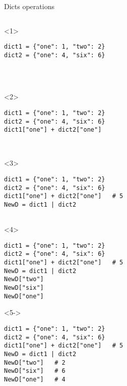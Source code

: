 \begin{frame}[fragile]{Dicts operations}

  \begin{columns}[onlytextwidth]
    \begin{column}{\textwidth}

      \begin{onlyenv}<1>
        \begin{lstlisting}[style=python,morekeywords={for, in, range, list}]
dict1 = {"one": 1, "two": 2}
dict2 = {"one": 4, "six": 6}




 \end{lstlisting}
      \end{onlyenv}

      \begin{onlyenv}<2>
        \begin{lstlisting}[style=python,morekeywords={for, in, range, list}]
dict1 = {"one": 1, "two": 2}
dict2 = {"one": 4, "six": 6}
dict1["one"] + dict2["one"]



 \end{lstlisting}
      \end{onlyenv}

      \begin{onlyenv}<3>
        \begin{lstlisting}[style=python,morekeywords={for, in, range, list}]
dict1 = {"one": 1, "two": 2}
dict2 = {"one": 4, "six": 6}
dict1["one"] + dict2["one"]   # 5
NewD = dict1 | dict2


 \end{lstlisting}
      \end{onlyenv}

      \begin{onlyenv}<4>
        \begin{lstlisting}[style=python,morekeywords={for, in, range, list}]
dict1 = {"one": 1, "two": 2}
dict2 = {"one": 4, "six": 6}
dict1["one"] + dict2["one"]   # 5
NewD = dict1 | dict2
NewD["two"]
NewD["six"]
NewD["one"] \end{lstlisting}
      \end{onlyenv}

      \begin{onlyenv}<5->
        \begin{lstlisting}[style=python,morekeywords={for, in, range, list}]
dict1 = {"one": 1, "two": 2}
dict2 = {"one": 4, "six": 6}
dict1["one"] + dict2["one"]   # 5
NewD = dict1 | dict2
NewD["two"]   # 2
NewD["six"]   # 6
NewD["one"]   # 4 \end{lstlisting}
      \end{onlyenv}

    \end{column}
  \end{columns}

\end{frame}


